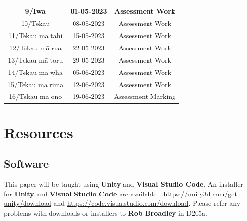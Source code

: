 \documentclass{article}
\begin{document}
\begin{tabular}{|c|c|c|c|}
	\footnotesize 9/Iwa            & \footnotesize 01-05-2023 & \multicolumn{2}{c|}{\footnotesize Assessment Work}                                                                 \\ \hline
	\footnotesize 10/Tekau         & \footnotesize 08-05-2023 & \multicolumn{2}{c|}{\footnotesize Assessment Work}                                                                 \\ \hline
	\footnotesize 11/Tekau mā tahi & \footnotesize 15-05-2023 & \multicolumn{2}{c|}{\footnotesize Assessment Work}                                                                 \\ \hline
	\footnotesize 12/Tekau mā rua  & \footnotesize 22-05-2023 & \multicolumn{2}{c|}{\footnotesize Assessment Work}                                                                 \\ \hline
	\footnotesize 13/Tekau mā toru & \footnotesize 29-05-2023 & \multicolumn{2}{c|}{\footnotesize Assessment Work}                                                     \\ \hline
	\footnotesize 14/Tekau mā whā  & \footnotesize 05-06-2023 & \multicolumn{2}{c|}{\footnotesize Assessment Work} \\ \hline 
	\footnotesize 15/Tekau mā rima & \footnotesize 12-06-2023 & \multicolumn{2}{c|}{\footnotesize Assessment Work}                                                       \\ \hline
	\footnotesize 16/Tekau mā ono  & \footnotesize 19-06-2023 & \multicolumn{2}{c|}{\footnotesize Assessment Marking}                                                         \\ \hline
\end{tabular}

\section*{Resources}

\subsection*{Software}
This paper will be taught using \textbf{Unity} and \textbf{Visual Studio Code}. An installer for \textbf{Unity} and \textbf{Visual Studio Code} are available - \href{https://unity3d.com/get-unity/download}{https://unity3d.com/get-unity/download} and \href{https://code.visualstudio.com/download}{https://code.visualstudio.com/download}. Please refer any problems with downloads or installers to \textbf{Rob Broadley} in D205a.
\end{document}
